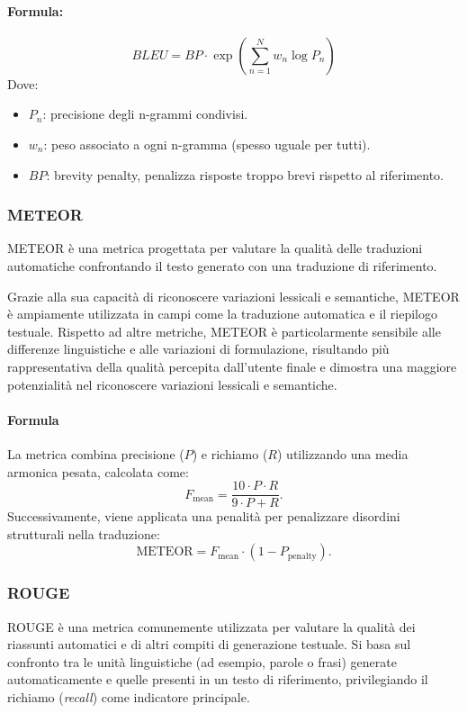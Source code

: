 \documentclass[../main.tex]{subfiles}
\begin{document}
\paragraph{Formula:}
\[
BLEU = BP \cdot \exp \left( \sum_{n=1}^{N} w_n \log P_n \right)
\]
Dove:
\begin{itemize}
    \item \(P_n\): precisione degli n-grammi condivisi.
    \item \(w_n\): peso associato a ogni n-gramma (spesso uguale per tutti).
    \item \(BP\): brevity penalty, penalizza risposte troppo brevi rispetto al riferimento.
\end{itemize}

\subsubsection{METEOR}

METEOR \cite{article} è una metrica progettata per valutare la qualità delle traduzioni automatiche confrontando il testo generato con una traduzione di riferimento. 

Grazie alla sua capacità di riconoscere variazioni lessicali e semantiche, METEOR è ampiamente utilizzata in campi come la traduzione automatica e il riepilogo testuale. Rispetto ad altre metriche, METEOR è particolarmente sensibile alle differenze linguistiche e alle variazioni di formulazione, risultando più rappresentativa della qualità percepita dall'utente finale e dimostra una maggiore potenzialità nel riconoscere variazioni lessicali e semantiche.

\paragraph{Formula}
La metrica combina precisione (\(P\)) e richiamo (\(R\)) utilizzando una media armonica pesata, calcolata come:
\[
F_{\text{mean}} = \frac{10 \cdot P \cdot R}{9 \cdot P + R}.
\]
Successivamente, viene applicata una penalità per penalizzare disordini strutturali nella traduzione:
\[
\text{METEOR} = F_{\text{mean}} \cdot (1 - P_\text{penalty}).
\]

\subsubsection{ROUGE}

ROUGE \cite{lin-2004-rouge} è una metrica comunemente utilizzata per valutare la qualità dei riassunti automatici e di altri compiti di generazione testuale. 
Si basa sul confronto tra le unità linguistiche (ad esempio, parole o frasi) generate automaticamente e quelle presenti in un testo di riferimento, privilegiando il richiamo (\textit{recall}) come indicatore principale.
\end{document}
